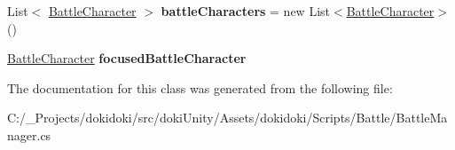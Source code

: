 \begin{DoxyCompactItemize}
\item 
List$<$ \hyperlink{classdoki_battle_1_1_battle_character}{Battle\+Character} $>$ {\bfseries battle\+Characters} = new List$<$\hyperlink{classdoki_battle_1_1_battle_character}{Battle\+Character}$>$()\hypertarget{classdoki_battle_1_1_battle_manager_ae0ac0921109c6d7856f7e7f94a8796b1}{}\label{classdoki_battle_1_1_battle_manager_ae0ac0921109c6d7856f7e7f94a8796b1}

\item 
\hyperlink{classdoki_battle_1_1_battle_character}{Battle\+Character} {\bfseries focused\+Battle\+Character}\hypertarget{classdoki_battle_1_1_battle_manager_a6e01a4a9ce9014cd2f5534bd13678a0d}{}\label{classdoki_battle_1_1_battle_manager_a6e01a4a9ce9014cd2f5534bd13678a0d}

\end{DoxyCompactItemize}


The documentation for this class was generated from the following file\+:\begin{DoxyCompactItemize}
\item 
C\+:/\+\_\+\+Projects/dokidoki/src/doki\+Unity/\+Assets/dokidoki/\+Scripts/\+Battle/Battle\+Manager.\+cs\end{DoxyCompactItemize}
